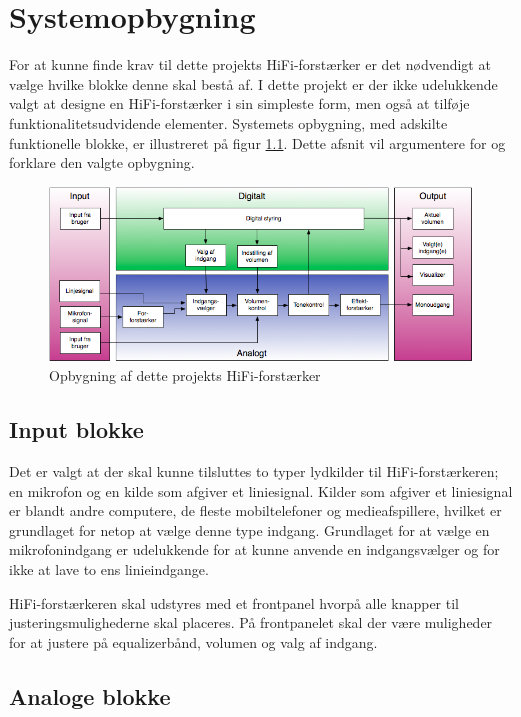 \chapter{Systemopbygning}
For at kunne finde krav til dette projekts HiFi-forstærker er det nødvendigt at vælge hvilke blokke denne skal bestå af. I dette projekt er der ikke udelukkende valgt at designe en HiFi-forstærker i sin simpleste form, men også at tilføje funktionalitetsudvidende elementer. Systemets opbygning, med adskilte funktionelle blokke, er illustreret på figur \ref{fig:hififorstaerker_opbygning}. Dette afsnit vil argumentere for og forklare den valgte opbygning. 


\begin{figure}[h]
\centering
\includegraphics[scale=0.6]{valg_af_loesning/systemopbygning/forstaerker_opbygning.png}
\caption{Opbygning af dette projekts HiFi-forstærker}
\label{fig:hififorstaerker_opbygning}
\end{figure}


\section*{Input blokke}
Det er valgt at der skal kunne tilsluttes to typer lydkilder til HiFi-forstærkeren; en mikrofon og en kilde som afgiver et liniesignal. Kilder som afgiver et liniesignal er blandt andre computere, de fleste mobiltelefoner og medieafspillere, hvilket er grundlaget for netop at vælge denne type indgang. 
Grundlaget for at vælge en mikrofonindgang er udelukkende for at kunne anvende en indgangsvælger og for ikke at lave to ens linieindgange. 

HiFi-forstærkeren skal udstyres med et frontpanel hvorpå alle knapper til justeringsmulighederne skal placeres. På frontpanelet skal der være muligheder for at justere på equalizerbånd, volumen og valg af indgang.

\section*{Analoge blokke}

